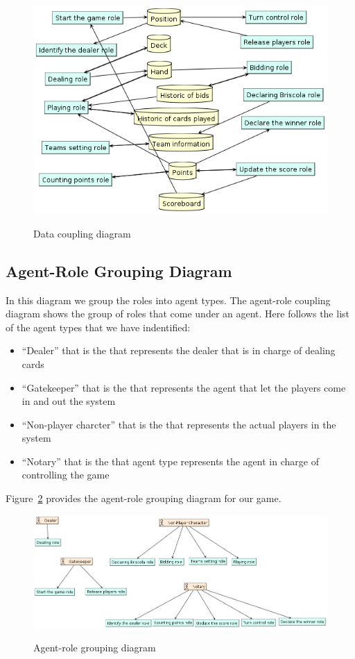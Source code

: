 \documentclass[a4paper]{article}
\begin{document}
\begin{figure}[htp]
  \centering
  \includegraphics[keepaspectratio,scale=0.45]{pdt/images/architectural_design/data_coupling.png}
  \label{fig:datacoupl}
  \caption{Data coupling diagram}
\end{figure}

\subsection{Agent-Role Grouping Diagram}

In this diagram we group the roles into agent types. The agent-role coupling diagram shows the group of roles that come under an agent. Here follows the list of the agent types that we have indentified:
\begin{itemize}
  \item ``Dealer'' that is the that represents the dealer that is in charge of dealing cards
  \item ``Gatekeeper'' that is the that represents the agent that let the players come in and out the system
  \item ``Non-player charcter'' that is the that represents the actual players in the system
  \item ``Notary'' that is the that agent type represents the agent in charge of controlling the game
\end{itemize}

Figure~\ref{fig:agentrole} provides the agent-role grouping diagram for our game.

\begin{figure}[htp]
  \centering
  \includegraphics[keepaspectratio,scale=0.45]{pdt/images/architectural_design/aget-role_grouping.png}
  \label{fig:agentrole}
  \caption{Agent-role grouping diagram}
\end{figure}
\end{document}
